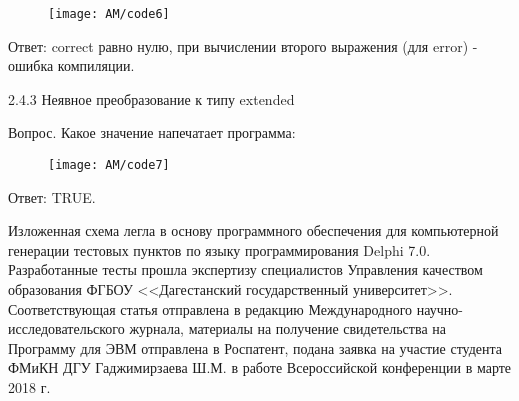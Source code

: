 \begin{figure}[H]
	\centering
	\texttt{[image: AM/code6]}
\end{figure}

%
%

Ответ: \foreignlanguage{english}{correct} равно нулю, при вычислении второго выражения (для
\foreignlanguage{english}{error}) - ошибка компиляции.

2.4.3 Неявное преобразование к типу extended

Вопрос. Какое значение напечатает программа:

\begin{figure}[H]
	\centering
	\texttt{[image: AM/code7]}
\end{figure}
%
%
%
%
%

Ответ: \foreignlanguage{english}{TRUE}.

Изложенная схема легла в основу программного обеспечения для компьютерной генерации тестовых пунктов по языку программирования Delphi 7.0. Разработанные тесты прошла экспертизу специалистов Управления качеством образования ФГБОУ <<Дагестанский государственный университет>>. Соответствующая статья отправлена в редакцию Международного научно-исследовательского журнала, материалы на получение свидетельства на Программу для ЭВМ отправлена в Роспатент, подана заявка на участие студента ФМиКН ДГУ Гаджимирзаева Ш.М. в работе Всероссийской конференции в марте 2018 г.














